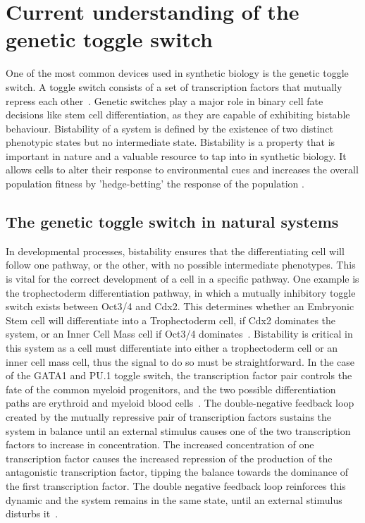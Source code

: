 
\section{Current understanding of the genetic toggle switch}

One of the most common devices used in synthetic biology is the genetic toggle switch. A toggle switch consists of a set of transcription factors that mutually repress each other~\autocite{Gardner:2000vha}. Genetic switches play a major role in binary cell fate decisions like stem cell differentiation, as they are capable of exhibiting bistable behaviour. Bistability of a system is defined by the existence of two distinct phenotypic states but no intermediate state. Bistability is a property that is important in nature and a valuable resource to tap into in synthetic biology. It allows cells to alter their response to environmental cues and increases the overall population fitness by 'hedge-betting' the response of the population \autocite{XXX}. 

\subsection{The genetic toggle switch in natural systems}
In developmental processes, bistability ensures that the differentiating cell will follow one pathway, or the other, with no possible intermediate phenotypes. This is vital for the correct development of a cell in a specific pathway. One example is the trophectoderm differentiation pathway, in which a mutually inhibitory toggle switch exists between Oct3/4 and Cdx2. This determines whether an Embryonic Stem cell will differentiate into a Trophectoderm cell, if Cdx2 dominates the system, or an Inner Cell Mass cell if Oct3/4 dominates~\autocite{Niwa:2005fz}. Bistability is critical in this system as a cell must differentiate into either a trophectoderm cell or an inner cell mass cell, thus the signal to do so must be straightforward. In the case of the GATA1 and PU.1 toggle switch, the transcription factor pair controls the fate of the common myeloid progenitors, and the two possible differentiation paths are erythroid and myeloid blood cells~\autocite{Chickarmane:2009by}. The double-negative feedback loop created by the mutually repressive pair of transcription factors sustains the system in balance until an external stimulus causes one of the two transcription factors to increase in concentration. The increased concentration of one transcription factor causes the increased repression of the production of the antagonistic transcription factor, tipping the balance towards the dominance of the first transcription factor. The double negative feedback loop reinforces this dynamic and the system remains in the same state, until an external stimulus disturbs it~\autocite{FerrellJr:2002fh}.

